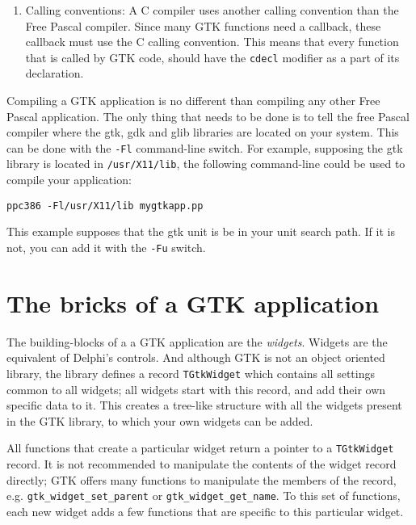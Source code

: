 \documentclass[10pt]{article}
\begin{document}
\begin{enumerate}
can be used to retrieve the widget flags, but not to set them. so things like 
\begin{lstlisting}{invaliduseofmacro}
GTK_WIDGET_FLAGS(wid):=GTK_WIDGET_FLAGS(wid) and someflag;
\end{lstlisting}
will not work, since this is a function, and NOT a macro as in C. 
\item Calling conventions: A C compiler uses another calling convention 
than the Free Pascal compiler. Since many GTK functions need a callback,
these callback must use the C calling convention. This means that every
function that is called by GTK code, should have the \lstinline|cdecl| 
modifier as a part of its declaration.
\end{enumerate}

Compiling a GTK application is no different than compiling any other Free
Pascal application. The only thing that needs to be done is to tell the free
Pascal compiler where the gtk, gdk and glib libraries are located on your
system. This can be done with the \verb|-Fl| command-line switch. For
example, supposing the gtk library is located in \verb|/usr/X11/lib|, the
following command-line could be used to compile your application:
\begin{verbatim}
ppc386 -Fl/usr/X11/lib mygtkapp.pp
\end{verbatim}
This example supposes that the gtk unit is be in your unit search path. If
it is not, you can add it with the \verb|-Fu| switch.

\section{The bricks of a GTK application}
The building-blocks of a a GTK application are the {\em widgets}. 
Widgets are the equivalent of Delphi's controls. And although GTK 
is not an object oriented library, the library defines a record 
\lstinline|TGtkWidget| which contains all settings common to all
widgets; all widgets start with this record, and add their own 
specific data to it. This creates a tree-like structure with all 
the widgets present in the GTK library, to which your own widgets 
can be added.

All functions that create a particular widget return a pointer
to a \lstinline|TGtkWidget| record. It is not recommended to 
manipulate the contents of the widget record directly; GTK offers 
many functions to manipulate the members of the record, e.g.  
\lstinline|gtk_widget_set_parent| or \lstinline|gtk_widget_get_name|.
To this set of functions, each new widget adds a few functions that are 
specific to this particular widget. 
\end{document}
